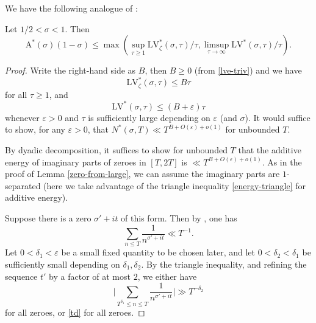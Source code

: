 \documentclass[a4paper, 10pt]{amsart}
\newcommand{\eps}{\varepsilon}
\newcommand{\LV}{\mathrm{LV}}
\newcommand{\A}{\mathrm{A}}
\begin{document}
We have the following analogue of :

\begin{lemma}\label{zeroe-from-large}  Let $1/2 < \sigma < 1$.  Then
    $$ \A^*(\sigma)(1-\sigma) \leq \max\left( \sup_{\tau \geq 1} \LV^*_\zeta(\sigma,\tau)/\tau, \limsup_{\tau \to \infty} \LV^*(\sigma,\tau)/\tau \right).$$
    \end{lemma}

    \begin{proof}
    Write the right-hand side as $B$, then $B \geq 0$ (from \eqref{lve-triv}) and we have
    \begin{equation}\label{lvze-bound}
        \LV^*_\zeta(\sigma,\tau) \leq B \tau
    \end{equation}
    for all $\tau \geq 1$, and
    \begin{equation}\label{lve-bound}
        \LV^*(\sigma,\tau) \leq (B+\eps) \tau
    \end{equation}
    whenever $\eps>0$ and $\tau$ is sufficiently large depending on $\eps$ (and $\sigma$).  It would suffice to show, for any $\eps>0$, that $N^*(\sigma,T) \ll T^{B+O(\eps)+o(1)}$ for unbounded $T$.

    By dyadic decomposition, it suffices to show for unbounded $T$ that the additive energy of imaginary parts of zeroes in $[T,2T]$ is $\ll T^{B+O(\eps)+o(1)}$.  As in the proof of Lemma \ref{zero-from-large}, we can assume the imaginary parts are $1$-separated (here we take advantage of the triangle inequality \eqref{energy-triangle} for additive energy).

    Suppose there is a zero $\sigma'+i t$ of this form.  Then by  \cite[Theorem 1.8]{ivic}, one has
    $$ \sum_{n \leq T} \frac{1}{n^{\sigma'+it}} \ll T^{-1}.$$
    Let $0 < \delta_1 < \eps$ be a small fixed quantity to be chosen later, and let $0 < \delta_2 < \delta_1$ be sufficiently small depending on $\delta_1,\delta_2$.  By the triangle inequality, and refining the sequence $t'$ by a factor of at most $2$, we either have
    $$ \bigg|\sum_{T^{\delta_1} \leq n \leq T} \frac{1}{n^{\sigma'+it}} \bigg| \gg T^{-\delta_2}$$
    for all zeroes, or \eqref{td} for all zeroes.


\end{proof}
\end{document}
